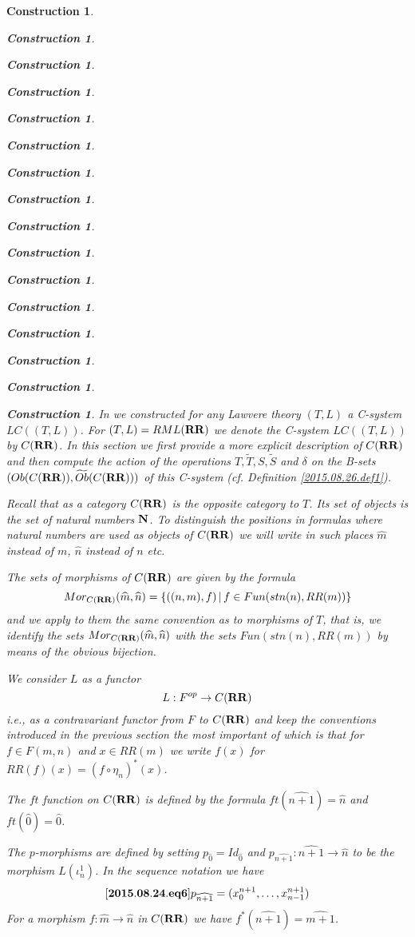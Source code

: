 \documentclass[12pt]{amsart}
\newenvironment{eq}{\begin{equation}}{\end{equation}}
\newtheorem{construction}[proposition]{Construction}
\newcommand{\llabel}[1]{\label{#1}[{\bf #1}]}
\newcommand{\sr}{\rightarrow}
\newcommand{\nn}{{\bf N\rm}}
\newcommand{\nat}{\nn}
\newcommand{\wt}{\widetilde}
\newcommand{\wh}{\widehat}
\newcommand{\mbind}[1]{{#1^*}}
\newcommand{\RR}{{\bf RR}}
\begin{document}
\begin{construction}
\begin{construction}
\begin{construction}
\begin{construction}
\begin{construction}
\begin{construction}
\begin{construction}
\begin{construction}
\begin{construction}
\begin{construction}
\begin{construction}
\begin{construction}
\begin{construction}
\begin{construction}
\begin{construction}
\begin{construction}
In \cite{LandC} we constructed for any Lawvere theory $(T,L)$ a C-system $LC((T,L))$. For $(T,L)=RML(\RR)$ we denote the C-system $LC((T,L))$ by $C(\RR)$. In this section we first provide a more explicit description of $C(\RR)$ and then compute the action of the operations $T,\wt{T},S,\wt{S}$ and $\delta$ on the B-sets $(Ob(C(\RR)),\wt{Ob}(C(\RR)))$ of this C-system (cf. Definition \ref{2015.08.26.def1}).    

Recall that as a category $C(\RR)$ is the opposite category to $T$.  Its set of objects is the set of natural numbers $\nat$. To distinguish the positions in formulas where natural numbers are used as objects of $C(\RR)$ we will write in such places $\wh{m}$ instead of $m$, $\wh{n}$ instead of $n$ etc.  

The sets of morphisms of $C(\RR)$ are given by the formula 
%
$$Mor_{C(\RR)}(\wh{m},\wh{n})=\{((n,m),f)\,|\,f\in Fun(stn(n),RR(m))\}$$
%
and we apply to them the same convention as to morphisms of $T$, that is, we identify the sets $Mor_{C(\RR)}(\wh{m},\wh{n})$ with the sets $Fun(stn(n),RR(m))$ by means of the obvious bijection.

We consider $L$ as a functor
%
$${L}:F^{op}\sr C(\RR)$$
%
i.e., as a contravariant functor from $F$ to $C(\RR)$ and keep the conventions introduced in the previous section the most important of which is that for $f\in F(m,n)$ and $x\in RR(m)$ we write $f(x)$ for $RR(f)(x)=\mbind{(f\circ \eta_{n})}(x)$. 

The $ft$ function on $C(\RR)$ is defined by the formula $ft(\wh{n+1})=\wh{n}$ and $ft(\wh{0})=\wh{0}$.

The $p$-morphisms are defined by setting $p_{\wh{0}}=Id_{\wh{0}}$ and $p_{\wh{n+1}}:\wh{n+1}\sr \wh{n}$ to be the morphism $L(\iota_n^1)$. In the sequence notation we have
%
\begin{eq}\llabel{2015.08.24.eq6}
p_{\wh{n+1}}=(x_0^{n+1},\dots,x_{n-1}^{n+1})
\end{eq}
%
For a morphism $f:\wh{m}\sr \wh{n}$ in $C(\RR)$ we have $f^*(\wh{n+1})=\wh{m+1}$. 


\end{construction}
\end{construction}
\end{construction}
\end{construction}
\end{construction}
\end{construction}
\end{construction}
\end{construction}
\end{construction}
\end{construction}
\end{construction}
\end{construction}
\end{construction}
\end{construction}
\end{construction}
\end{construction}
\end{document}
